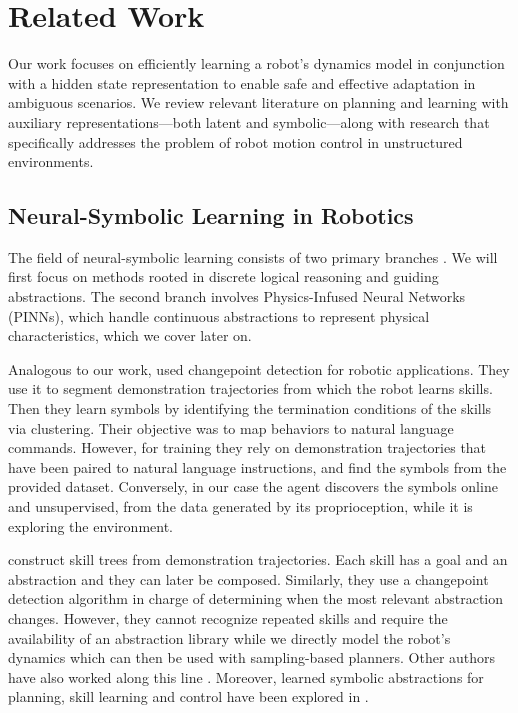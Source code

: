 \documentclass[Afour,sageh,times]{sagej}
\theoremstyle{lemma}
\begin{document}
\section{Related Work} \label{sec:relatedwork}

Our work focuses on efficiently learning a robot's dynamics model in conjunction with a hidden state representation to enable safe and effective adaptation in ambiguous scenarios. 
We review relevant literature on planning and learning with auxiliary representations—both latent and symbolic—along with research that specifically addresses the problem of robot motion control in unstructured environments.

\subsection{Neural-Symbolic Learning in Robotics} 

The field of neural-symbolic learning consists of two primary branches \cite[]{wang2024imperative}. We will first focus on methods rooted in discrete logical reasoning and guiding abstractions. The second branch involves Physics-Infused Neural Networks (PINNs), which handle continuous abstractions to represent physical characteristics, which we cover later on.

Analogous to our work, \citet{gopalan2020simultaneously} used changepoint detection for robotic applications. They use it to segment demonstration trajectories from which the robot learns skills. Then they learn symbols by identifying the termination conditions of the skills via clustering. Their objective was to map behaviors to natural language commands. However, for training they rely on demonstration trajectories that have been paired to natural language instructions, and find the symbols from the provided dataset. Conversely, in our case the agent discovers the symbols online and unsupervised, from the data generated by its proprioception, while it is exploring the environment.

\cite{konidaris2012robot} construct skill trees from demonstration trajectories. Each skill has a goal and an abstraction and they can later be composed. Similarly, they use a changepoint detection algorithm in charge of determining when the most relevant abstraction changes. However, they cannot recognize repeated skills and require the availability of an abstraction library while we directly model the robot's dynamics which can then be used with sampling-based planners. Other authors have also worked along this line \cite[]{kulic2009online, chiappa2010movement, niekum2012learning}. Moreover, learned symbolic abstractions for planning, skill learning and control have been explored in \cite[]{silver2022learning, achterhold2023learning, belta2007symbolic, kumar2023learning, rosen2023synthesizing}.
\end{document}
